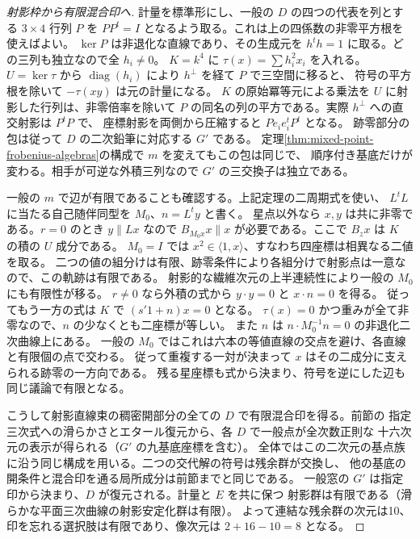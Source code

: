 \begin{proof}[射影枠から有限混合印へ]
計量を標準形にし、一般の $D$ の四つの代表を列とする $3\times4$ 行列 $P$ を
$PP^t=I$ となるよう取る。これは上の四係数の非零平方根を使えばよい。
$\ker P$ は非退化な直線であり、その生成元を $h^th=1$ に取る。どの三列も独立なので全 $h_i\ne0$。
$K=k^4$ に $\tau(x)=\sum h_i^2 x_i$ を入れる。$U=\ker\tau$ から
$\operatorname{diag}(h_i)$ により $h^\perp$ を経て $P$ で三空間に移ると、
符号の平方根を除いて $-\tau(xy)$ は元の計量になる。
$K$ の原始冪等元による乗法を $U$ に射影した行列は、非零倍率を除いて
$P$ の同名の列の平方である。実際 $h^\perp$ への直交射影は $P^tP$ で、
座標射影を両側から圧縮すると $P e_i e_i^t P^t$ となる。
跡零部分の包は従って $D$ の二次鉛筆に対応する $G'$ である。
定理\ref{thm:mixed-point-frobenius-algebras}の構成で $m$ を変えてもこの包は同じで、
順序付き基底だけが変わる。相手が可逆な外積三列なので $G'$ の三交換子は独立である。

一般の $m$ で辺が有限であることも確認する。上記定理の二周期式を使い、
$L^tL$ に当たる自己随伴同型を $M_0$、$n=L^ty$ と書く。
星点以外なら $x,y$ は共に非零である。$r=0$ のとき $y\parallel Lx$ なので
$B_{M_0x}x\parallel x$ が必要である。ここで $B_zx$ は $K$ の積の $U$ 成分である。
$M_0=I$ では $x^2\in\langle1,x\rangle$、すなわち四座標は相異なる二値を取る。
二つの値の組分けは有限、跡零条件により各組分けで射影点は一意なので、この軌跡は有限である。
射影的な繊維次元の上半連続性により一般の $M_0$ にも有限性が移る。
$r\ne0$ なら外積の式から $y\cdot y=0$ と $x\cdot n=0$ を得る。
従ってもう一方の式は $K$ で $(s'1+n)x=0$ となる。
$\tau(x)=0$ かつ重みが全て非零なので、$n$ の少なくとも二座標が等しい。
また $n$ は $n\cdot M_0^{-1}n=0$ の非退化二次曲線上にある。
一般の $M_0$ ではこれは六本の等値直線の交点を避け、各直線と有限個の点で交わる。
従って重複する一対が決まって $x$ はその二成分に支えられる跡零の一方向である。
残る星座標も式から決まり、符号を逆にした辺も同じ議論で有限となる。

こうして射影直線束の稠密開部分の全ての $D$ で有限混合印を得る。前節の
指定三次式への滑らかさとエタール復元から、各 $D$ で一般点が全次数正則な
十六次元の表示が得られる（$G'$ の九基底座標を含む）。
全体ではこの二次元の基点族に沿う同じ構成を用いる。二つの交代解の符号は残余群が交換し、
他の基底の開条件と混合印を通る局所成分は前節までと同じである。
一般窓の $G'$ は指定印から決まり、$D$ が復元される。計量と $E$ を共に保つ
射影群は有限である（滑らかな平面三次曲線の射影安定化群は有限）。
よって連結な残余群の次元は10、印を忘れる選択肢は有限であり、像次元は $2+16-10=8$ となる。
\end{proof}

